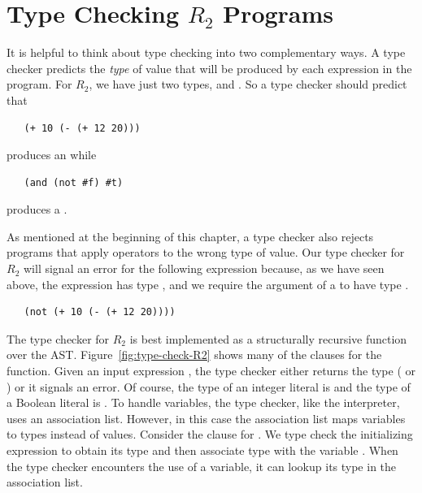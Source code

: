 \documentclass[11pt]{book}
\begin{document}
\section{Type Checking $R_2$ Programs}
\label{sec:type-check-r2}

It is helpful to think about type checking into two complementary
ways. A type checker predicts the \emph{type} of value that will be
produced by each expression in the program.  For $R_2$, we have just
two types,  and . So a type checker should
predict that
\begin{lstlisting}
   (+ 10 (- (+ 12 20)))
\end{lstlisting}
produces an  while
\begin{lstlisting}
   (and (not #f) #t)
\end{lstlisting}
produces a .

As mentioned at the beginning of this chapter, a type checker also
rejects programs that apply operators to the wrong type of value. Our
type checker for $R_2$ will signal an error for the following
expression because, as we have seen above, the expression  has type , and we require the argument of a
 to have type .
\begin{lstlisting}
   (not (+ 10 (- (+ 12 20))))
\end{lstlisting}

The type checker for $R_2$ is best implemented as a structurally
recursive function over the AST. Figure~\ref{fig:type-check-R2} shows
many of the clauses for the  function.  Given an
input expression , the type checker either returns the type
( or ) or it signals an error.  Of course,
the type of an integer literal is  and the type of a
Boolean literal is .  To handle variables, the type
checker, like the interpreter, uses an association list. However, in
this case the association list maps variables to types instead of
values. Consider the clause for .  We type check the
initializing expression to obtain its type  and then associate
type  with the variable . When the type checker
encounters the use of a variable, it can lookup its type in the
association list.
\end{document}
